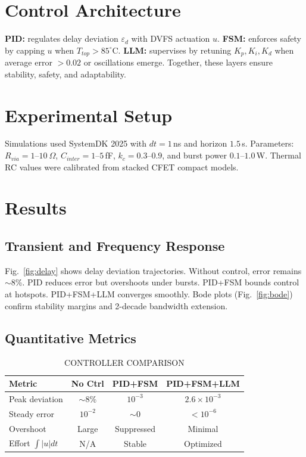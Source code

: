 \documentclass[conference]{IEEEtran}
\begin{document}
\section{Control Architecture}
\textbf{PID:} regulates delay deviation $\varepsilon_d$ with DVFS actuation $u$.  
\textbf{FSM:} enforces safety by capping $u$ when $T_{top}>85^\circ$C.  
\textbf{LLM:} supervises by retuning $K_p,K_i,K_d$ when average error $>0.02$ or oscillations emerge.  
Together, these layers ensure stability, safety, and adaptability.

\section{Experimental Setup}
Simulations used SystemDK 2025 with $dt=1$\,ns and horizon $1.5$\,s. Parameters: $R_{via}=1$--$10~\Omega$, $C_{inter}=1$--$5$\,fF, $k_c=0.3$--$0.9$, and burst power $0.1$--$1.0$\,W. Thermal RC values were calibrated from stacked CFET compact models.

\section{Results}
\subsection{Transient and Frequency Response}
Fig.~\ref{fig:delay} shows delay deviation trajectories. Without control, error remains $\sim$8\%. PID reduces error but overshoots under bursts. PID+FSM bounds control at hotspots. PID+FSM+LLM converges smoothly.  
Bode plots (Fig.~\ref{fig:bode}) confirm stability margins and 2-decade bandwidth extension.

\subsection{Quantitative Metrics}
\begin{table}[b]
\renewcommand{\arraystretch}{1.1}
\caption{CONTROLLER COMPARISON}
\centering
\begin{tabular}{|l|c|c|c|}
\hline
Metric & No Ctrl & PID+FSM & PID+FSM+LLM \\
\hline
Peak deviation & $\sim$8\% & $10^{-3}$ & $2.6\times 10^{-3}$ \\
Steady error   & $10^{-2}$ & $\sim$0   & $<10^{-6}$ \\
Overshoot      & Large     & Suppressed & Minimal \\
Effort $\int|u|dt$ & N/A   & Stable    & Optimized \\
\hline
\end{tabular}
\end{table}
\end{document}
